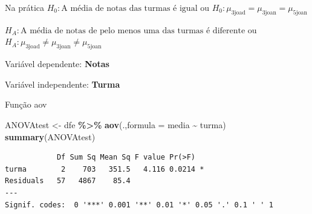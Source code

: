 \documentclass[
  9pt,
  ignorenonframetext,
  aspectratio=169]{beamer}
\newenvironment{Shaded}{\begin{snugshade}}{\end{snugshade}}
\newcommand{\DataTypeTok}[1]{\textcolor[rgb]{0.13,0.29,0.53}{#1}}
\newcommand{\KeywordTok}[1]{\textcolor[rgb]{0.13,0.29,0.53}{\textbf{#1}}}
\newcommand{\NormalTok}[1]{#1}
\newcommand{\OperatorTok}[1]{\textcolor[rgb]{0.81,0.36,0.00}{\textbf{#1}}}
\newcommand{\StringTok}[1]{\textcolor[rgb]{0.31,0.60,0.02}{#1}}
\begin{document}
\begin{frame}{Na prática}
\protect\hypertarget{na-pruxe1tica}{}
\(H_0:\text{A média de notas das turmas é igual}\) ou
\(H_0:\mu_\text{3joad}=\mu_\text{3joan}=\mu_\text{5joan}\)

\(H_A:\text{A média de notas de pelo menos uma das turmas é diferente}\)
ou \(H_A:\mu_\text{3joad} \neq \mu_\text{3joan} \neq \mu_\text{5joan}\)

Variável dependente: \textbf{Notas}

Variável independente: \textbf{Turma}
\end{frame}

\begin{frame}[fragile]{Função aov}
\protect\hypertarget{funuxe7uxe3o-aov}{}
\begin{Shaded}
\begin{Highlighting}[]
\NormalTok{ANOVAtest \textless{}{-}}\StringTok{ }\NormalTok{dfe }\OperatorTok{\%\textgreater{}\%}\StringTok{ }\KeywordTok{aov}\NormalTok{(.,}\DataTypeTok{formula =}\NormalTok{ media }\OperatorTok{\textasciitilde{}}\StringTok{ }\NormalTok{turma)}
\KeywordTok{summary}\NormalTok{(ANOVAtest)}
\end{Highlighting}
\end{Shaded}

\begin{verbatim}
            Df Sum Sq Mean Sq F value Pr(>F)  
turma        2    703   351.5   4.116 0.0214 *
Residuals   57   4867    85.4                 
---
Signif. codes:  0 '***' 0.001 '**' 0.01 '*' 0.05 '.' 0.1 ' ' 1
\end{verbatim}
\end{frame}
\end{document}
